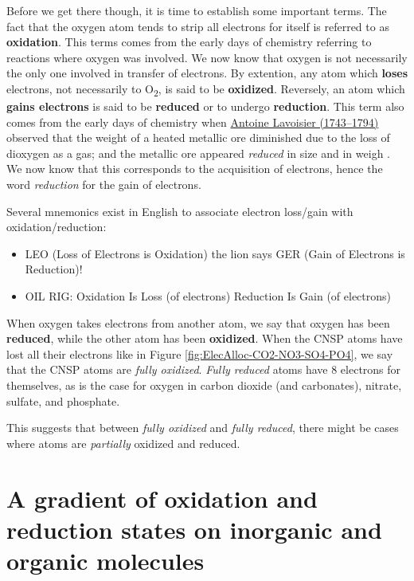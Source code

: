\documentclass[]{book}
\providecommand{\tightlist}{%
  \setlength{\itemsep}{0pt}\setlength{\parskip}{0pt}}
\theoremstyle{definition}
\theoremstyle{definition}
\theoremstyle{definition}
\theoremstyle{remark}
\begin{document}
Before we get there though, it is time to establish some important
terms. The fact that the oxygen atom tends to strip all electrons for
itself is referred to as \textbf{oxidation}. This terms comes from the
early days of chemistry referring to reactions where oxygen was
involved. We now know that oxygen is not necessarily the only one
involved in transfer of electrons. By extention, any atom which
\textbf{loses} electrons, not necessarily to O\textsubscript{2}, is said
to be \textbf{oxidized}. Reversely, an atom which \textbf{gains
electrons} is said to be \textbf{reduced} or to undergo
\textbf{reduction}. This term also comes from the early days of
chemistry when
\href{https://en.wikipedia.org/wiki/Antoine_Lavoisier}{Antoine Lavoisier
(1743--1794)} observed that the weight of a heated metallic ore
diminished due to the loss of dioxygen as a gas; and the metallic ore
appeared \emph{reduced} in size and in weigh
\citep{Wikipedia_contributors2018-dg}. We now know that this corresponds
to the acquisition of electrons, hence the word \emph{reduction} for the
gain of electrons.

Several mnemonics exist in English to associate electron loss/gain with
oxidation/reduction:

\begin{itemize}
\tightlist
\item
  LEO (Loss of Electrons is Oxidation) the lion says GER (Gain of
  Electrons is Reduction)!
\item
  OIL RIG: Oxidation Is Loss (of electrons) Reduction Is Gain (of
  electrons)
\end{itemize}

When oxygen takes electrons from another atom, we say that oxygen has
been \textbf{reduced}, while the other atom has been \textbf{oxidized}.
When the CNSP atoms have lost all their electrons like in Figure
\ref{fig:ElecAlloc-CO2-NO3-SO4-PO4}, we say that the CNSP atoms are
\emph{fully oxidized}. \emph{Fully reduced} atoms have 8 electrons for
themselves, as is the case for oxygen in carbon dioxide (and
carbonates), nitrate, sulfate, and phosphate.

This suggests that between \emph{fully oxidized} and \emph{fully
reduced}, there might be cases where atoms are \emph{partially} oxidized
and reduced.

\section{A gradient of oxidation and reduction states on inorganic and
organic
molecules}\label{a-gradient-of-oxidation-and-reduction-states-on-inorganic-and-organic-molecules}
\end{document}
